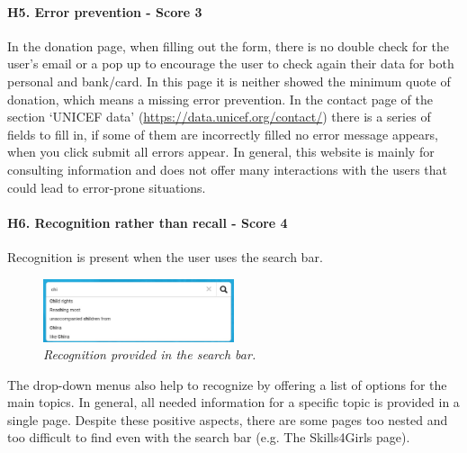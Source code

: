 






\paragraph{H5. Error prevention - Score 3}  \label{subsec:H5}	In the donation page, when filling out the form, there is no double check for the user's email or a pop up to encourage the user to check again their data for both personal and bank/card.
In this page it is neither showed the minimum quote of donation, which means a missing error prevention.
\newline In the contact page of the section ‘UNICEF data’ (\href {https://data.unicef.org/contact/}{https://data.unicef.org/contact/}) there is a series of fields to fill in, if some of them are incorrectly filled no error message appears, when you click submit all errors appear.
\newline In general, this website is mainly for consulting information and does not offer many interactions with the users that could lead to error-prone situations.
\newline
\newline \paragraph{H6. Recognition rather than recall - Score 4}  \label{subsec:H6}	Recognition is present when the user uses the search bar.
\begin{figure}[!h]
	\begin{center}
		\includegraphics[width=0.5\textwidth]{FinalScores12.jpg}
		\captionsetup{font=small}
		\caption{\textit{Recognition provided in the search bar.}}
	\end{center}
\end{figure}
\newline The drop-down menus also help to recognize by offering a list of options for the main topics. 
\newline In general, all needed information for a specific topic is provided in a single page.
\newline Despite these positive aspects, there are some pages too nested and too difficult to find even with the search bar (e.g. The Skills4Girls page).
